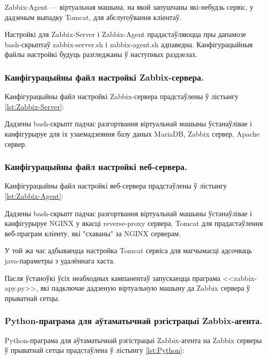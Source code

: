 Zabbix-Agent --- віртуальная машына, на якой запушчаны які-небудзь сервіс,
у дадзеным выпадку Tomcat, для абслугоўвання кліентаў.

Настройкі для Zabbix-Server і Zabbix-Agent прадастаўляюцца пры дапамозе
bash-скрыптаў zabbix-server.sh і zabbix-agent.sh адпаведна.
Канфігурацыйныя файлы настройкі будуць разгледжаны ў наступных раздзелах.

\subsubsection{Канфігурацыйны файл настройкі Zabbix-сервера.}
Канфігурацыйны файл настройкі Zabbix-сервера прадстаўлены ў лістынгу
\ref{lst:Zabbix-Server}:



Дадзены bash-скрыпт падчас разгортвання віртуальнай машыны
ўстанаўлівае і канфігурыруе для іх узаемадзеяння
базу даных MariaDB, Zabbix сервер, Apache сервер.

\subsubsection{Канфігурацыйны файл настройкі веб-сервера.}
Канфігурацыйны файл настройкі веб-сервера прадстаўлены ў лістынгу
\ref{lst:Zabbix-Agent}:



Дадзены bash-скрыпт падчас разгортвання віртуальнай машыны
ўстанаўлівае і канфігурыруе NGINX у якасці reverse-proxy сервера,
Tomcat для прадастаўлення веб-праграм кліенту, які "схаваны" за NGINX серверам.

У той жа час адбываецца настройка Tomcat сервіса для магчымасці адсочваць
java-параметры з удалённага хаста.

Пасля ўстаноўкі ўсіх неабходных кампанентаў запускаецца праграма 
<<zabbix-apy.py>>, які падключае дадзеную віртуальную машыну да
Zabbix сервера ў прыватнай сетцы.

\subsubsection{Python-праграма для аўтаматычнай рэгістрацыі Zabbix-агента.}
Python-праграма для аўтаматычнай рэгістрацыі Zabbix-агента на Zabbix серверы ў
прыватнай сетцы прадстаўлена ў лістынгу
\ref{lst:Python}:

